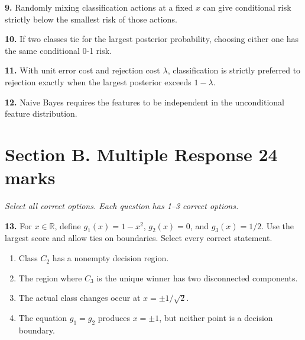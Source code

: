 \documentclass[11pt,a4paper]{article}
\begin{document}
\par\noindent\begin{minipage}{\linewidth}
\textbf{9.} Randomly mixing classification actions at a fixed \(x\) can give conditional risk strictly below the smallest risk of those actions.
\end{minipage}\par\vspace{3mm}
\par\noindent\begin{minipage}{\linewidth}
\textbf{10.} If two classes tie for the largest posterior probability, choosing either one has the same conditional 0-1 risk.
\end{minipage}\par\vspace{3mm}
\par\noindent\begin{minipage}{\linewidth}
\textbf{11.} With unit error cost and rejection cost \(\lambda\), classification is strictly preferred to rejection exactly when the largest posterior exceeds \(1-\lambda\).
\end{minipage}\par\vspace{3mm}
\par\noindent\begin{minipage}{\linewidth}
\textbf{12.} Naive Bayes requires the features to be independent in the unconditional feature distribution.
\end{minipage}\par\vspace{3mm}
\newpage\section*{Section B. Multiple Response \hfill 24 marks}
\textit{Select all correct options. Each question has 1--3 correct options.}\par
\par\noindent\begin{minipage}{\linewidth}
\textbf{13.} For \(x\in\mathbb R\), define \(g_1(x)=1-x^2\), \(g_2(x)=0\), and \(g_3(x)=1/2\). Use the largest score and allow ties on boundaries. Select every correct statement.
\begin{enumerate}[label=(\Alph*),leftmargin=8mm,itemsep=2pt,topsep=2pt]
\item Class \(C_2\) has a nonempty decision region.
\item The region where \(C_3\) is the unique winner has two disconnected components.
\item The actual class changes occur at \(x=\pm1/\sqrt2\).
\item The equation \(g_1=g_2\) produces \(x=\pm1\), but neither point is a decision boundary.
\end{enumerate}

\end{minipage}\par\vspace{3mm}
\end{document}
